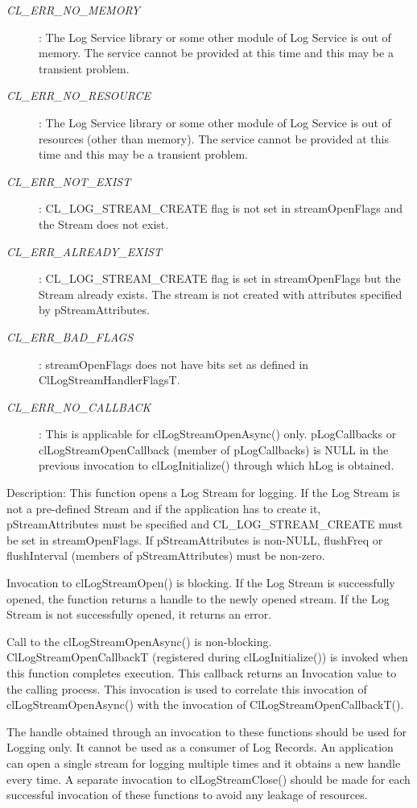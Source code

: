 \begin{flushleft}
\begin{Desc}
\begin{description}
\item[{\em CL\_\-ERR\_\-NO\_\-MEMORY}]: The Log Service library or some other module of Log Service is out of memory. The service cannot 
be provided at this time and this may be a transient problem.
\item[{\em CL\_\-ERR\_\-NO\_\-RESOURCE}]: The Log Service library or some other module of Log Service is out of resources 
(other than memory). The service cannot be provided at this time and this may be a transient problem.
\item[{\em CL\_\-ERR\_\-NOT\_\-EXIST}]: CL\_\-LOG\_\-STREAM\_\-CREATE flag is not set in streamOpenFlags and the Stream does not exist.
\item[{\em CL\_\-ERR\_\-ALREADY\_\-EXIST}]: CL\_\-LOG\_\-STREAM\_\-CREATE flag is set in streamOpenFlags but the Stream already exists. The stream is not 
created with attributes specified by pStreamAttributes.
\item[{\em CL\_\-ERR\_\-BAD\_\-FLAGS}]: streamOpenFlags does not have bits set as defined in ClLogStreamHandlerFlagsT.
\item[{\em CL\_\-ERR\_\-NO\_\-CALLBACK}]: This is applicable for clLogStreamOpenAsync() only. pLogCallbacks or clLogStreamOpenCallback (member of
pLogCallbacks) is NULL in the previous invocation to clLogInitialize() through which hLog is obtained.
\end{description}
\end{Desc}
\begin{Desc}
\item[Description:] This function opens a Log Stream for logging. If the Log Stream is not a pre-defined Stream and if the application has to create it,
pStreamAttributes must be specified and CL\_\-LOG\_\-STREAM\_\-CREATE must be set in streamOpenFlags. If pStreamAttributes is non-NULL, 
flushFreq or flushInterval (members of pStreamAttributes) must be non-zero.
\par
Invocation to clLogStreamOpen() is blocking. If the Log Stream is successfully opened, the function returns a handle to the newly opened stream. 
If the Log Stream is not successfully opened, it returns an error.
\par
Call to the clLogStreamOpenAsync() is non-blocking.  
ClLogStreamOpenCallbackT (registered during clLogInitialize()) is invoked when this function completes execution. This callback returns an Invocation 
value to the calling process. This invocation is used to correlate this invocation of clLogStreamOpenAsync() with the invocation of 
ClLogStreamOpenCallbackT().
\par
The handle obtained through an invocation to these functions should be used for Logging only. It cannot be used as a consumer of Log Records.
An application can open a single stream for logging multiple times and it obtains a new handle every time. A separate invocation to 
clLogStreamClose() should be made for each successful invocation of these functions to avoid any leakage of resources.


\end{Desc}
\end{flushleft}
